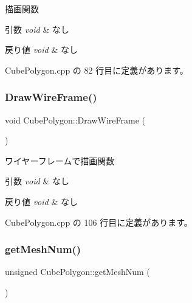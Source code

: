 描画関数 


\begin{DoxyParams}{引数}
{\em void} & なし \\
\hline
\end{DoxyParams}

\begin{DoxyRetVals}{戻り値}
{\em void} & なし \\
\hline
\end{DoxyRetVals}


 Cube\+Polygon.\+cpp の 82 行目に定義があります。

\mbox{\label{class_cube_polygon_adceff4ea7cce991c3c16a68178c19057}} 
\subsubsection{\texorpdfstring{Draw\+Wire\+Frame()}{DrawWireFrame()}}
{\footnotesize\ttfamily void Cube\+Polygon\+::\+Draw\+Wire\+Frame (\begin{DoxyParamCaption}{ }\end{DoxyParamCaption})}



ワイヤーフレームで描画関数 


\begin{DoxyParams}{引数}
{\em void} & なし \\
\hline
\end{DoxyParams}

\begin{DoxyRetVals}{戻り値}
{\em void} & なし \\
\hline
\end{DoxyRetVals}


 Cube\+Polygon.\+cpp の 106 行目に定義があります。

\mbox{\label{class_cube_polygon_a50970957b530b7089487799210b14903}} 
\subsubsection{\texorpdfstring{get\+Mesh\+Num()}{getMeshNum()}}
{\footnotesize\ttfamily unsigned Cube\+Polygon\+::get\+Mesh\+Num (\begin{DoxyParamCaption}{ }\end{DoxyParamCaption})}



